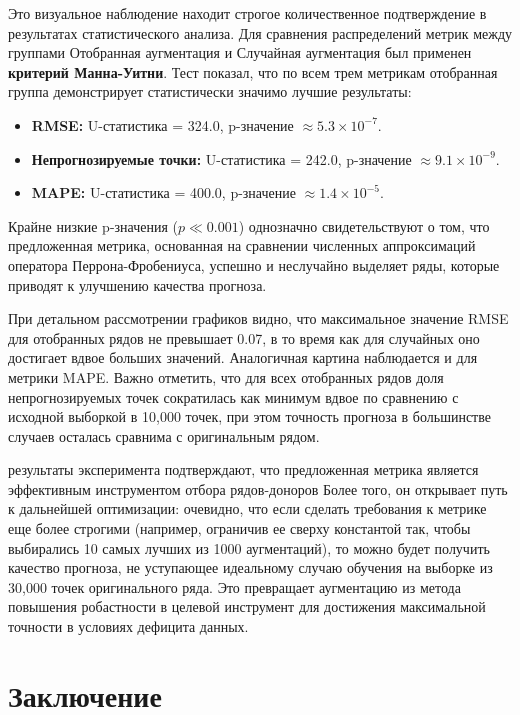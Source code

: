 \documentclass[a4paper,12pt]{extarticle}
\begin{document}
Это визуальное наблюдение находит строгое количественное подтверждение в результатах
 статистического анализа. Для сравнения распределений метрик между группами Отобранная 
 аугментация и Случайная аугментация был применен \textbf{критерий Манна-Уитни}. Тест
  показал, что по всем трем метрикам отобранная группа демонстрирует статистически значимо лучшие результаты:
\begin{itemize}
    \item \textbf{RMSE:} U-статистика = 324.0, p-значение $\approx 5.3 \times 10^{-7}$.
    \item \textbf{Непрогнозируемые точки:} U-статистика = 242.0, p-значение $\approx 9.1 \times 10^{-9}$.
    \item \textbf{MAPE:} U-статистика = 400.0, p-значение $\approx 1.4 \times 10^{-5}$.
\end{itemize}
Крайне низкие p-значения ($p \ll 0.001$) однозначно свидетельствуют о том, что 
предложенная метрика, основанная на сравнении численных аппроксимаций оператора Перрона-Фробениуса, успешно и неслучайно выделяет ряды, которые приводят к улучшению качества прогноза.

При детальном рассмотрении графиков видно, что максимальное значение RMSE для
 отобранных рядов не превышает 0.07, в то время как для случайных оно достигает
  вдвое больших значений. Аналогичная картина наблюдается и для метрики MAPE.
   Важно отметить, что для всех отобранных рядов доля непрогнозируемых точек сократилась как минимум вдвое по сравнению с исходной выборкой в 10,000 точек, при этом точность прогноза в
    большинстве случаев осталась сравнима с оригинальным рядом.

результаты эксперимента подтверждают, что предложенная метрика является
 эффективным инструментом отбора рядов-доноров
 Более того, он открывает путь к дальнейшей оптимизации: очевидно, что если сделать 
 требования к метрике еще более строгими (например, ограничив ее сверху константой 
 так, чтобы выбирались 10 самых лучших из 1000 аугментаций), то можно будет получить
  качество прогноза, не уступающее идеальному случаю обучения на выборке из 30,000 
  точек оригинального ряда. Это превращает аугментацию из метода повышения робастности в целевой
 инструмент для достижения максимальной точности в условиях дефицита данных.



\section{Заключение}
\end{document}
